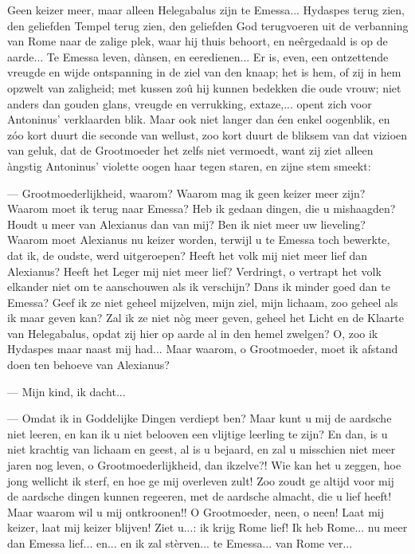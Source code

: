 \documentclass[a4paper, 12pt, oneside, dutch]{article}
\begin{document}
Geen keizer meer, maar alleen Helegabalus zijn te Emessa... Hydaspes terug zien, den geliefden Tempel terug zien, den geliefden God terugvoeren uit de verbanning van Rome naar de zalige plek, waar hij thuis behoort, en neêrgedaald is op de aarde... Te Emessa leven, dànsen, en eeredienen... Er is, even, een ontzettende vreugde en wijde ontspanning in de ziel van den knaap; het is hem, of zij in hem opzwelt van zaligheid; met kussen zoû hij kunnen bedekken die oude vrouw; niet anders dan gouden glans, vreugde en verrukking, extaze,... opent zich voor Antoninus' verklaarden blik. Maar ook niet langer dan éen enkel oogenblik, en zóo kort duurt die seconde van wellust, zoo kort duurt de bliksem van dat vizioen van geluk, dat de Grootmoeder het zelfs niet vermoedt, want zij ziet alleen àngstig Antoninus' violette oogen haar tegen staren, en zijne stem smeekt:

--- Grootmoederlijkheid, waarom? Waarom mag ik geen keizer meer zijn? Waarom moet ik terug naar Emessa? Heb ik gedaan dingen, die u mishaagden? Houdt u meer van Alexianus dan van mij? Ben ik niet meer uw lieveling? Waarom moet Alexianus nu keizer worden, terwijl u te Emessa toch bewerkte, dat ik, de oudste, werd uitgeroepen? Heeft het volk mij niet meer lief dan Alexianus? Heeft het Leger mij niet meer lief? Verdringt, o vertrapt het volk elkander niet om te aanschouwen als ik verschijn? Dans ik minder goed dan te Emessa? Geef ik ze niet geheel mijzelven, mijn ziel, mijn lichaam, zoo geheel als ik maar geven kan? Zal ik ze niet nòg meer geven, geheel het Licht en de Klaarte van Helegabalus, opdat zij hier op aarde al in den hemel zwelgen? O, zoo ik Hydaspes maar naast mij had... Maar waarom, o Grootmoeder, moet ik afstand doen ten behoeve van Alexianus?

--- Mijn kind, ik dacht...

--- Omdat ik in Goddelijke Dingen verdiept ben? Maar kunt u mij de aardsche niet leeren, en kan ik u niet belooven een vlijtige leerling te zijn? En dan, is u niet krachtig van lichaam en geest, al is u bejaard, en zal u misschien niet meer jaren nog leven, o Grootmoederlijkheid, dan ikzelve?! Wie kan het u zeggen, hoe jong wellicht ik sterf, en hoe ge mij overleven zult! Zoo zoudt ge altijd voor mij de aardsche dingen kunnen regeeren, met de aardsche almacht, die u lief heeft! Maar waarom wil u mij ontkroonen!! O Grootmoeder, neen, o neen! Laat mij keizer, laat mij keizer blijven! Ziet u...: ik krijg Rome lief! Ik heb Rome... nu meer dan Emessa lief... en... en ik zal stèrven... te Emessa... van Rome ver...
\end{document}
